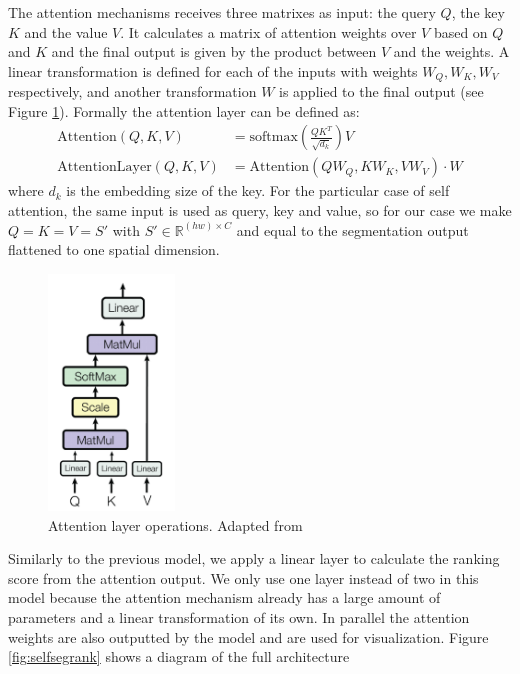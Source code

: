 The attention mechanisms receives three matrixes as input: the query $Q$, the key $K$ and the value
$V$. It calculates a matrix of attention weights over $V$ based on $Q$ and $K$ and the final output
is given by the product between $V$ and the weights. A linear transformation is defined
for each of the inputs with weights $W_Q, W_K, W_V$ respectively, and another transformation $W$
is applied to the final output (see Figure \ref{fig:attention_mech}).
Formally the attention layer can be defined as:
\begin{align}
	\label{eq:attention}
	\text{Attention}(Q,K,V) &= \text{softmax}\left (\frac{QK^T}{\sqrt{d_k}} \right ) V \\
	\label{eq:attention_layer}
	\text{AttentionLayer}(Q,K,V) &=  \text{Attention}(QW_Q,KW_K,VW_V)\cdot W
\end{align}
where $d_k$ is the embedding size of the key. For the particular case of self attention,
the same input is used as query, key and value, so for our case we make $Q=K=V=S'$ with
$S' \in \mathbb{R}^{(hw) \times C}$ and equal to the segmentation output flattened to one
spatial dimension.

\begin{figure}[ht]
	\begin{center}
	\includegraphics[width=0.3\textwidth]{./figures/attention.png}
	\caption[Attention Mechanism]{Attention layer operations. Adapted from }
	\label{fig:attention_mech}
	\end{center}
\end{figure}

Similarly to the previous model, we apply a linear layer to calculate the ranking score from the attention output.
We only use one layer instead of two in this model because the attention mechanism already has a large amount of parameters and a
linear transformation of its own.
In parallel the attention weights are also outputted by the model and are used for visualization. Figure \ref{fig:selfsegrank}
shows a diagram of the full architecture

